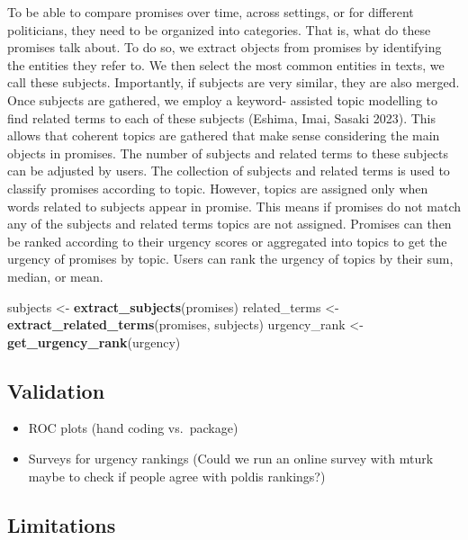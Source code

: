 \documentclass[
]{article}
\newenvironment{Shaded}{\begin{snugshade}}{\end{snugshade}}
\newcommand{\FunctionTok}[1]{\textcolor[rgb]{0.13,0.29,0.53}{\textbf{#1}}}
\newcommand{\NormalTok}[1]{#1}
\newcommand{\OtherTok}[1]{\textcolor[rgb]{0.56,0.35,0.01}{#1}}
\providecommand{\tightlist}{%
  \setlength{\itemsep}{0pt}\setlength{\parskip}{0pt}}
\begin{document}
To be able to compare promises over time, across settings, or for
different politicians, they need to be organized into categories. That
is, what do these promises talk about. To do so, we extract objects from
promises by identifying the entities they refer to. We then select the
most common entities in texts, we call these subjects. Importantly, if
subjects are very similar, they are also merged. Once subjects are
gathered, we employ a keyword- assisted topic modelling to find related
terms to each of these subjects (Eshima, Imai, Sasaki 2023). This allows
that coherent topics are gathered that make sense considering the main
objects in promises. The number of subjects and related terms to these
subjects can be adjusted by users. The collection of subjects and
related terms is used to classify promises according to topic. However,
topics are assigned only when words related to subjects appear in
promise. This means if promises do not match any of the subjects and
related terms topics are not assigned. Promises can then be ranked
according to their urgency scores or aggregated into topics to get the
urgency of promises by topic. Users can rank the urgency of topics by
their sum, median, or mean.

\begin{Shaded}
\begin{Highlighting}[]
\NormalTok{subjects }\OtherTok{\textless{}{-}} \FunctionTok{extract\_subjects}\NormalTok{(promises)}
\NormalTok{related\_terms }\OtherTok{\textless{}{-}} \FunctionTok{extract\_related\_terms}\NormalTok{(promises, subjects)}
\NormalTok{urgency\_rank }\OtherTok{\textless{}{-}} \FunctionTok{get\_urgency\_rank}\NormalTok{(urgency)}
\end{Highlighting}
\end{Shaded}

\hypertarget{validation}{%
\subsection{Validation}\label{validation}}

\begin{itemize}
\tightlist
\item
  ROC plots (hand coding vs.~package)
\item
  Surveys for urgency rankings (Could we run an online survey with mturk
  maybe to check if people agree with poldis rankings?)
\end{itemize}

\hypertarget{limitations}{%
\subsection{Limitations}\label{limitations}}
\end{document}
